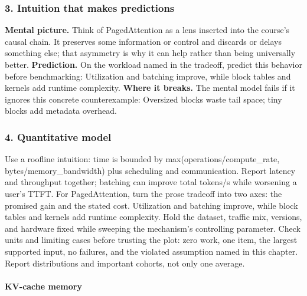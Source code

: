 \subsubsection*{3. Intuition that makes predictions}
\textbf{Mental picture.} Think of PagedAttention as a lens inserted into the course's causal chain. It preserves some information or control and discards or delays something else; that asymmetry is why it can help rather than being universally better.
\textbf{Prediction.} On the workload named in the tradeoff, predict this behavior before benchmarking: Utilization and batching improve, while block tables and kernels add runtime complexity.
\textbf{Where it breaks.} The mental model fails if it ignores this concrete counterexample: Oversized blocks waste tail space; tiny blocks add metadata overhead.
\subsubsection*{4. Quantitative model}
Use a roofline intuition: time is bounded by max(operations/compute\_rate, bytes/memory\_bandwidth) plus scheduling and communication. Report latency and throughput together; batching can improve total tokens/s while worsening a user's TTFT.
For PagedAttention, turn the prose tradeoff into two axes: the promised gain and the stated cost. Utilization and batching improve, while block tables and kernels add runtime complexity. Hold the dataset, traffic mix, versions, and hardware fixed while sweeping the mechanism's controlling parameter.
Check units and limiting cases before trusting the plot: zero work, one item, the largest supported input, no failures, and the violated assumption named in this chapter. Report distributions and important cohorts, not only one average.
\paragraph{KV-cache memory}
